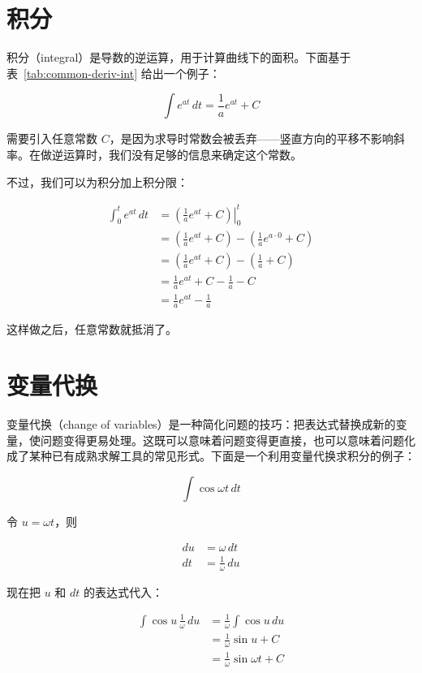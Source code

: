 \section{积分}
\label{sec:integrals}

积分（integral）是导数的逆运算，用于计算曲线下的面积。下面基于表~\ref{tab:common-deriv-int} 给出一个例子：

\[
  \int e^{at} \, dt = \frac{1}{a} e^{at} + C
\]

需要引入任意常数 $C$，是因为求导时常数会被丢弃——竖直方向的平移不影响斜率。在做逆运算时，我们没有足够的信息来确定这个常数。

不过，我们可以为积分加上积分限：

\begin{align*}
  \int_0^t e^{at} \, dt
    &= \left. \left( \frac{1}{a} e^{at} + C \right) \right|_0^t \\
    &= \left( \frac{1}{a} e^{at} + C \right) - \left( \frac{1}{a} e^{a \cdot 0} + C \right) \\
    &= \left( \frac{1}{a} e^{at} + C \right) - \left( \frac{1}{a} + C \right) \\
    &= \frac{1}{a} e^{at} + C - \frac{1}{a} - C \\
    &= \frac{1}{a} e^{at} - \frac{1}{a}
\end{align*}

这样做之后，任意常数就抵消了。

\section{变量代换}
\label{sec:changeofvariables}

变量代换（change of variables）是一种简化问题的技巧：把表达式替换成新的变量，使问题变得更易处理。这既可以意味着问题变得更直接，也可以意味着问题化成了某种已有成熟求解工具的常见形式。下面是一个利用变量代换求积分的例子：

\[
  \int \cos \omega t \, dt
\]

令 $u = \omega t$，则

\begin{align*}
  du &= \omega \, dt \\
  dt &= \frac{1}{\omega} \, du
\end{align*}

现在把 $u$ 和 $dt$ 的表达式代入：

\begin{align*}
  \int \cos u \, \frac{1}{\omega} \, du
    &= \frac{1}{\omega} \int \cos u \, du \\
    &= \frac{1}{\omega} \sin u + C \\
    &= \frac{1}{\omega} \sin \omega t + C
\end{align*}

